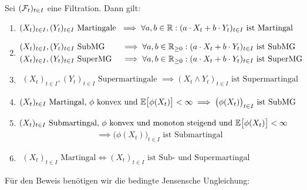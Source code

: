 \begin{proposition}\label{Prop2.1}\enter
Sei $(\mathcal{F}_t)_{t\in I}$ eine Filtration. Dann gilt:
\begin{enumerate}[label=\alph*)]
\item $\begin{aligned}
(X_t)_{t\in I},(Y_t)_{t\in I}\text{ Martingale }
\implies\forall a,b\in\mathbb{R}: (a\cdot X_t+b\cdot Y_t)_{t\in I}\text{ ist Martingal}
\end{aligned}$
\item $\begin{aligned}
&(X_t)_{t\in I},(Y_t)_{t\in I}\text{ SubMG}&
&\implies\forall a,b\in\mathbb{R}_{\geq0}: (a\cdot X_t+b\cdot Y_t)_{t\in I}\text{ ist SubMG}\\
&(X_t)_{t\in I},(Y_t)_{t\in I}\text{ SuperMG}&
&\implies\forall a,b\in\mathbb{R}_{\geq0}: (a\cdot X_t+b\cdot Y_t)_{t\in I}\text{ ist SuperMG}
\end{aligned}$
\item $\begin{aligned}
(X_t)_{t\in I},(Y_t)_{t\in I}\text{ Supermartingale }
\implies (X_t\wedge Y_t)_{t\in I}\text{ ist Supermartingal}
\end{aligned}$
\item $\begin{aligned}
(X_t)_{t\in I}\text{ Martingal, $\phi$ konvex und }\mathbb{E}\big[\phi(X_t)\big]<\infty
\implies \big(\phi(X_t)\big)_{t\in I}\text{ ist SubMG}
\end{aligned}$
\item $\begin{aligned}
(X_t)_{t\in I}\text{ Submartingal, $\phi$ konvex und monoton steigend und }\mathbb{E}\big[\phi(X_t)\big]<\infty
\end{aligned}$
\begin{align*}
\implies \big(\phi(X_t)\big)_{t\in I}\text{ ist Submartingal}
\end{align*}
\item $\begin{aligned}
(X_t)_{t\in I}\text{ Martingal}
\Longleftrightarrow
(X_t)_{t\in I}\text{ ist Sub- und Supermartingal}
\end{aligned}$
\end{enumerate}
\end{proposition}

Für den Beweis benötigen wir die bedingte Jensensche Ungleichung:

